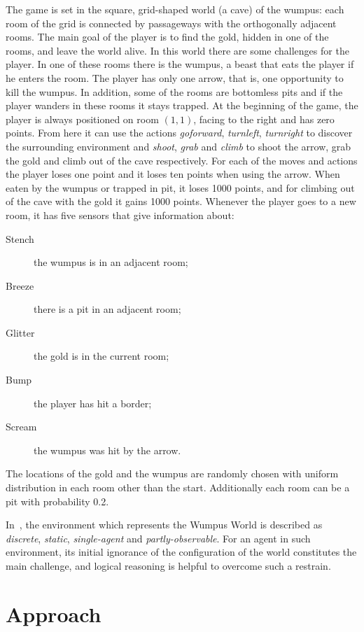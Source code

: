 \documentclass{llncs}
\begin{document}
The game is set in the square, grid-shaped world (a cave) of the wumpus: each room of the grid is connected by passageways with the orthogonally adjacent rooms.
The main goal of the player is to find the gold, hidden in one of the rooms, and leave the world alive.
In this world there are some challenges for the player.
In one of these rooms there is the wumpus, a beast that eats the player if he enters the room. The player has only one arrow, that is, one opportunity to kill the wumpus. In addition, some of the rooms are bottomless pits and if the player wanders in these rooms it stays trapped. At the beginning of the game, the player is always positioned on room $(1,1)$, facing to the right and has zero points. From here it can use the actions \emph{goforward}, \emph{turnleft}, \emph{turnright} to discover the surrounding environment and \emph{shoot}, \emph{grab} and \emph{climb} to shoot the arrow, grab the gold and climb out of the cave respectively. For each of the moves and actions the player loses one point and it loses ten points when using the arrow. When eaten by the wumpus or trapped in pit, it loses 1000 points, and for climbing out of the cave with the gold it gains 1000 points. Whenever the player goes to a new room, it has five sensors that give information about:
\begin{description}
	\item[Stench]{the wumpus is in an adjacent room;}
	\item[Breeze]{there is a pit in an adjacent room;}
	\item[Glitter]{the gold is in the current room;}
	\item[Bump]{the player has hit a border;}
	\item[Scream]{the wumpus was hit by the arrow.}
\end{description}
The locations of the gold and the wumpus are randomly chosen with uniform distribution in each room other than the start. Additionally each room can be a pit with probability 0.2.

In~\cite{book:aima}, the environment which represents the Wumpus World is described as \emph{discrete}, \emph{static}, \emph{single-agent} and \emph{partly-observable}. For an agent in such environment, its initial ignorance of the configuration of the world constitutes the main challenge, and logical reasoning is helpful to overcome such a restrain.

\section{Approach}
\end{document}

